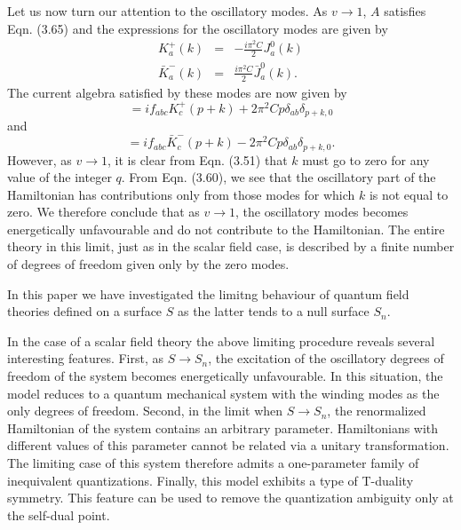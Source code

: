 \documentclass[a4paper,12pt]{article}
\let\oldtheequation=\theequation
\def\doteqs#1{\setcounter{equation}{0}
            \def\theequation{{#1}.\oldtheequation}}
\newcounter{sxn}
\def\sx#1{\addtocounter{sxn}{1} \bigskip\medskip \goodbreak
\noindent{\large\bf
\centerline{\thesxn.~~#1}} \nobreak \medskip}
\def\sxn#1{\sx{#1} \doteqs{\thesxn}}
\begin{document}
Let us now turn our attention to the oscillatory modes. 
As $v \rightarrow 1$, $A$ satisfies Eqn. (3.65) and the expressions for the
oscillatory modes are given by 
\begin{eqnarray}
K^{+}_{a}(k)&=&-\frac{i {\pi}^2 C}{2}J^{0}_{a}(k)\nonumber\\
\bar{K}^{-}_{a}(k)&=&\frac{i {\pi}^2 C}{2}\bar{J}^{0}_{a}(k).
\end{eqnarray}
The current algebra satisfied by these modes are now given by
\begin{equation}
[ K^{+}_a(p) , K^{+}_b(k) ]=if_{abc}K^{+}_{c}(p+k)
+2 {\pi}^2 C p{\delta}_{ab}{\delta}_{p+k,0}
\end{equation}
and 
\begin{equation}
[ {\bar{K}}^{-}_a(p) , {\bar{K}}^{-}_b(k) ]=if_{abc}{\bar{K}}^{-}_{c}(p+k)
-2{\pi}^2 C p{\delta}_{ab}{\delta}_{p+k,0}.
\end{equation}
However, as $v \rightarrow 1$, it is clear from Eqn. (3.51) that
$k$ must go to zero for any value of the integer $q$.
From Eqn. (3.60), we see that
the oscillatory part of the Hamiltonian has contributions only 
from those modes for which $k$ is not equal to zero. We therefore conclude
that as $v \rightarrow 1$, the oscillatory modes becomes energetically
unfavourable and do not contribute to the Hamiltonian. The entire theory in
this limit, just as in the scalar field case, 
is described by a finite number of degrees of freedom 
given only by the zero modes.




\sxn{Conclusion}

In this paper we have investigated the limitng behaviour of 
quantum field theories defined on a 
surface $S$ as the latter  tends to a null surface $S_n$.

In the case of a scalar field theory the above limiting procedure reveals
several interesting features. First, 
as $S \rightarrow S_n$, the excitation of the 
oscillatory degrees of freedom of the system becomes energetically
unfavourable. 
In this situation, the model reduces to a
quantum mechanical system with the winding modes as the only degrees of
freedom. Second, in the limit when $S \rightarrow S_n$, the renormalized
Hamiltonian of the system contains an arbitrary parameter. 
Hamiltonians with different values of this parameter cannot be related via a
unitary transformation.
The limiting case of this system therefore admits a
one-parameter family of inequivalent quantizations. Finally, this model  
exhibits a type of T-duality symmetry. This feature can be used to
remove the quantization ambiguity only at the self-dual point.
\end{document}
